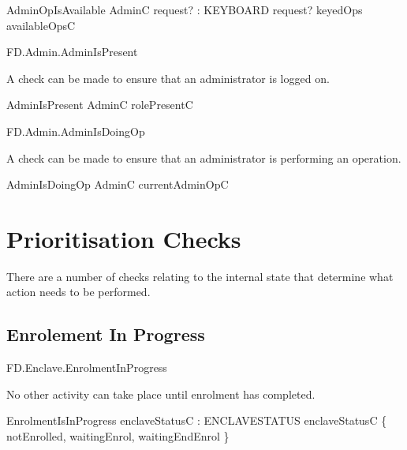 \begin{schema}{AdminOpIsAvailable}
        AdminC
\also
        request? : KEYBOARD
\where
        request? \in keyedOps \limg availableOpsC \rimg
\end{schema}


\begin{traceunit}{FD.Admin.AdminIsPresent}
\end{traceunit}

A check can be made to ensure that an administrator is logged on.

\begin{schema}{AdminIsPresent}
        AdminC
\where
        rolePresentC \neq \Nil
\end{schema}


\begin{traceunit}{FD.Admin.AdminIsDoingOp}
\end{traceunit}

A check can be made to ensure that an administrator is performing an operation.

\begin{schema}{AdminIsDoingOp}
        AdminC
\where
        currentAdminOpC \neq \Nil
\end{schema}



\section{Prioritisation Checks}

There are a number of checks relating to the internal state that
determine what action needs to be performed.


\subsection{Enrolement In Progress}
\begin{traceunit}{FD.Enclave.EnrolmentInProgress}
\end{traceunit}

No other activity can take place until enrolment has completed. 

\begin{schema}{EnrolmentIsInProgress}
        enclaveStatusC : ENCLAVESTATUS
\where
        enclaveStatusC \in \{ notEnrolled, waitingEnrol, waitingEndEnrol \}
\end{schema}

